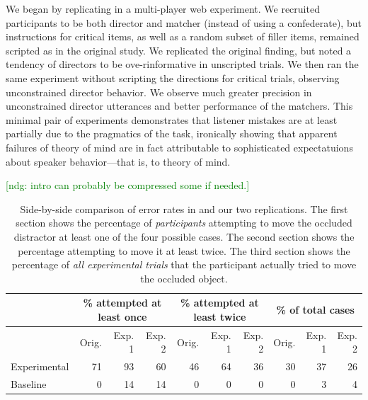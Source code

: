 \documentclass[10pt,letterpaper]{article}
\newcommand{\ndg}[1]{\textcolor{Green}{[ndg: #1]}}
\begin{document}
We began by replicating  in a multi-player web experiment. We recruited participants to be both director and matcher (instead of using a confederate), but instructions for critical items, as well as a random subset of filler items, remained scripted as in the original study. We replicated the original finding, but noted a tendency of directors to be ove-rinformative in unscripted trials. We then ran the same experiment without scripting the directions for critical trials, observing unconstrained director behavior. We observe much greater precision in unconstrained director utterances and better performance of the matchers. This minimal pair of experiments demonstrates that listener mistakes are at least partially due to the pragmatics of the task, ironically showing that apparent failures of theory of mind are in fact attributable to sophisticated expectatuions about speaker behavior---that is, to theory of mind.

\ndg{intro can probably be compressed some if needed.}

\begin{table}
\begin{center}
\begin{tabular}{ p{2cm} | r | r |  r || r | r | r || r | r | r}
& \multicolumn{3}{c||}{\% attempted at least once} & \multicolumn{3}{c||}{\% attempted at least twice} & \multicolumn{3}{c}{\% of total cases}\\
\hline
& Orig. & Exp. 1 & Exp. 2 & Orig. & Exp. 1 & Exp. 2 & Orig. & Exp. 1 & Exp. 2  \\
Experimental & 71 & 93 & 60 & 46 & 64 & 36 & 30 & 37 & 26\\
Baseline & 0 & 14 & 14 & 0 & 0 & 0 & 0 & 3 & 4\\
\end{tabular}
\caption{Side-by-side comparison of error rates in  and our two replications. The first section shows the percentage of \emph{participants} attempting to move the occluded distractor at least one of the four possible cases. The second section shows the percentage attempting to move it at least twice. The third section shows the percentage of \emph{all experimental trials} that the participant actually tried to move the occluded object. }
\label{table:mainResults}
\end{center}
\end{table}
\end{document}
